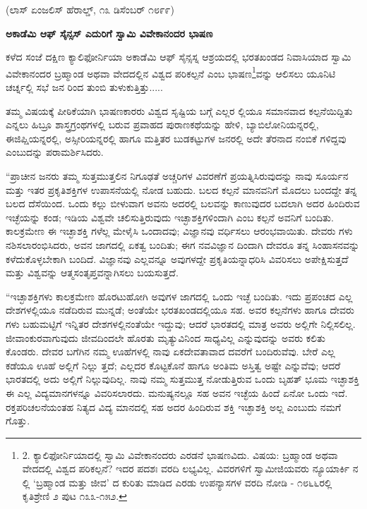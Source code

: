 \begin{center}
(ಲಾಸ್ ಏಂಜಲಿಸ್ ಹೆರಾಲ್ಡ್, ೧೩ ಡಿಸೆಂಬರ್ ೧೮೯೯)
\end{center}

\begin{center}
\textbf{ಅಕಾಡೆಮಿ ಆಫ್ ಸೈನ್ಸಸ್ ಎದುರಿಗೆ ಸ್ವಾಮಿ ವಿವೇಕಾನಂದರ ಭಾಷಣ}
\end{center}

ಕಳೆದ ಸಂಜೆ ದಕ್ಷಿಣ ಕ್ಯಾಲಿಫೋರ್ನಿಯಾ ಅಕಾಡೆಮಿ ಆಫ್ ಸೈನ್ಸಸ್ನ ಆಶ್ರಯದಲ್ಲಿ ಭರತಖಂಡದ ನಿವಾಸಿಯಾದ ಸ್ವಾಮಿ ವಿವೇಕಾನಂದರ ಬ್ರಹ್ಮಾಂಡ ಅಥವಾ ವೇದದಲ್ಲಿನ ವಿಶ್ವದ ಪರಿಕಲ್ಪನೆ ಎಂಬ ಭಾಷಣ\footnote{2. ಕ್ಯಾಲಿಫೋರ್ನಿಯಾದಲ್ಲಿ ಸ್ವಾಮಿ ವಿವೇಕಾನಂದರು ಎರಡನೆ ಭಾಷಣವಿದು. ವಿಷಯ: ಬ್ರಹ್ಮಾಂಡ ಅಥವಾ ವೇದದಲ್ಲಿ ವಿಶ್ವದ ಪರಿಕಲ್ಪನೆ? ಇದರ ಪದಶಃ ವರದಿ ಲಭ್ಯವಿಲ್ಲ. ವಿವರಗಳಿಗೆ ಸ್ವಾಮೀಜಿಯವರು ನ್ಯೂಯಾರ್ಕಿ ನ ಲ್ಲಿ ‘ಬ್ರಹ್ಮಾಂಡ ಮತ್ತು ಜೀವ’ ದ ಕುರಿತು ಮಾಡಿದ ಎರಡು ಉಪನ್ಯಾಸಗಳ ವರದಿ ನೋಡಿ - ೧೮೬೬ರಲ್ಲಿ ಕೃತಿಶ್ರೇಣಿ ೨ ಪುಟ ೧೩೩-೧೫೨.}ವನ್ನು ಆಲಿಸಲು ಯೂನಿಟಿ ಚರ್ಚ್ನಲ್ಲಿ ಸಭೆ ಜನ ರಿಂದ ತುಂಬಿ ತುಳುಕುತ್ತಿತ್ತು.....

ತಮ್ಮ ವಿಷಯಕ್ಕೆ ಪೀಠಿಕೆಯಾಗಿ ಭಾಷಣಕಾರರು ವಿಶ್ವದ ಸೃಷ್ಟಿಯ ಬಗ್ಗೆ ಎಲ್ಲರ ಲ್ಲಿಯೂ ಸಮಾನವಾದ ಕಲ್ಪನೆಯಿದ್ದಿತು ಎನ್ನಲು ಹಿಬ್ರೂ ಶಾಸ್ತ್ರಗ್ರಂಥಗಳಲ್ಲಿ ಬರುವ ಪ್ರವಾಹದ ಪುರಾಣಕಥೆಯನ್ನು ಹೇಳಿ, ಬ್ಯಾಬಿಲೋನಿಯನ್ನರಲ್ಲಿ, ಈಜಿಪ್ಷಿಯನ್ನರಲ್ಲಿ, ಅಸ್ಸೀರಿಯನ್ನರಲ್ಲಿ ಹಾಗೂ ಮತ್ತಿತರ ಬುಡಕಟ್ಟುಗಳ ಜನರಲ್ಲಿ ಅದೇ ತೆರನಾದ ನಂಬಿಕೆ ಗಳಿದ್ದವು ಎಂಬುದನ್ನು ಪರಾಮರ್ಶಿಸಿದರು.

“ಪ್ರಾಚೀನ ಜನರು ತಮ್ಮ ಸುತ್ತಮುತ್ತಲಿನ ನಿಗೂಢತೆ ಅಚ್ಚರಿಗಳ ವಿವರಣೆಗೆ ಪ್ರಯತ್ನಿಸಿರುವುದನ್ನು ನಾವು ಸೂರ್ಯನ ಮತ್ತು ಇತರ ಪ್ರಕೃತಿಶಕ್ತಿಗಳ ಉಪಾಸನೆಯಲ್ಲಿ ನೋಡ ಬಹುದು. ಬಲದ ಕಲ್ಪನೆ ಮಾನವನಿಗೆ ಮೊದಲು ಬಂದದ್ದೇ ತನ್ನ ಬಲದ ದೆಸೆಯಿಂದ. ಒಂದು ಕಲ್ಲು ಬೀಳುವಾಗ ಅವನು ಅದರಲ್ಲಿ ಬಲವನ್ನು ಕಾಣುವುದರ ಬದಲಾಗಿ ಅದರ ಹಿಂದಿರುವ ಇಚ್ಛೆಯನ್ನು ಕಂಡ; ಇಡಿಯ ವಿಶ್ವವೇ ಚಲಿಸುತ್ತಿರುವುದು ಇಚ್ಛಾಶಕ್ತಿಗಳಿಂದಾಗಿ ಎಂಬ ಕಲ್ಪನೆ ಅವನಿಗೆ ಬಂದಿತು. ಕಾಲಕ್ರಮೇಣ ಈ ಇಚ್ಛಾಶಕ್ತಿ ಗಳೆಲ್ಲ ಮೇಳೈಸಿ ಒಂದಾದವು; ವಿಜ್ಞಾನವು ವರ್ಧಿಸಲು ಆರಂಭವಾಯಿತು. ದೇವರು ಗಳು ನಶಿಸಲಾರಂಭಿಸಿದರು, ಅವನ ಜಾಗದಲ್ಲಿ ಏಕತ್ವ ಬಂದಿತು; ಈಗ ನವವಿಜ್ಞಾನ ದಿಂದಾಗಿ ದೇವರೂ ತನ್ನ ಸಿಂಹಾಸನವನ್ನು ಕಳೆದುಕೊಳ್ಳಬೇಕಾಗಿ ಬಂದಿದೆ. ವಿಜ್ಞಾನವು ಎಲ್ಲವನ್ನೂ ಅವುಗಳದ್ದೇ ಪ್ರಕೃತಿಯನ್ನಾಧರಿಸಿ ವಿವರಿಸಲು ಅಪೇಕ್ಷಿಸುತ್ತದೆ ಮತ್ತು ವಿಶ್ವವನ್ನು ಆತ್ಮಸಂತೃಪ್ತವನ್ನಾಗಿಸಲು ಬಯಸುತ್ತದೆ.

“ಇಚ್ಛಾಶಕ್ತಿಗಳು ಕಾಲಕ್ರಮೇಣ ಹೊರಟುಹೋಗಿ ಅವುಗಳ ಜಾಗದಲ್ಲಿ ಒಂದು ಇಚ್ಛೆ ಬಂದಿತು. ಇದು ಪ್ರಪಂಚದ ಎಲ್ಲ ದೇಶಗಳಲ್ಲಿಯೂ ನಡೆದಿರುವ ಮುನ್ನಡೆ; ಅಂತೆಯೇ ಭರತಖಂಡದಲ್ಲಿಯೂ ಸಹ. ಅವರ ಕಲ್ಪನೆಗಳು ಹಾಗೂ ದೇವರು ಗಳು ಬಹುಮಟ್ಟಿಗೆ ಇನ್ನಿತರ ದೇಶಗಳಲ್ಲಿನಂತೆಯೇ ಇದ್ದುವು; ಆದರೆ ಭಾರತದಲ್ಲಿ ಮಾತ್ರ ಅವರು ಅಲ್ಲಿಗೇ ನಿಲ್ಲಿಸಲಿಲ್ಲ. ಜೀವಾಂಕುರವಾಗುವುದು ಜೀವದಿಂದಲೇ ಹೊರತು ಮೃತ್ಯುವಿನಿಂದ ಸಾಧ್ಯವಿಲ್ಲ ಎನ್ನುವುದನ್ನು ಅವರು ಕಲಿತು ಕೊಂಡರು. ದೇವರ ಬಗೆಗಿನ ನಮ್ಮ ಊಹೆಗಳಲ್ಲಿ ನಾವು ಏಕದೇವತಾವಾದ ದವರೆಗೆ ಬಂದಿರುವೆವು. ಬೇರೆ ಎಲ್ಲ ಕಡೆಯೂ ಊಹೆ ಅಲ್ಲಿಗೆ ನಿಲ್ಲು ತ್ತದೆ; ಎಲ್ಲದರ ಕೊಟ್ಟಕೊನೆ ಹಾಗೂ ಅಂತಿಮ ಅಸ್ತಿತ್ವ ಅಷ್ಟೇ ಎನ್ನುವೆವು; ಆದರೆ ಭಾರತದಲ್ಲಿ ಅದು ಅಲ್ಲಿಗೆ ನಿಲ್ಲುವುದಿಲ್ಲ. ನಾವು ನಮ್ಮ ಸುತ್ತಮುತ್ತ ನೋಡುತ್ತಿರುವ ಒಂದು ಬೃಹತ್ ಭೂಮ ಇಚ್ಛಾಶಕ್ತಿ ಈ ಎಲ್ಲ ವಿದ್ಯಮಾನಗಳನ್ನೂ ವಿವರಿಸಲಾರದು. ಮನುಷ್ಯನಲ್ಲೂ ಸಹ ಅವನ ಇಚ್ಛೆಯ ಹಿಂದೆ ಏನೋ ಒಂದು ಇದೆ. ರಕ್ತಪರಿಚಲನೆಯಂತಹ ನಿತ್ಯದ ವಿದ್ಯ ಮಾನದಲ್ಲಿ ಸಹ ಅದರ ಹಿಂದಿರುವ ಶಕ್ತಿ ಇಚ್ಛಾಶಕ್ತಿ ಅಲ್ಲ ಎಂಬುದು ನಮಗೆ ಗೊತ್ತು.

